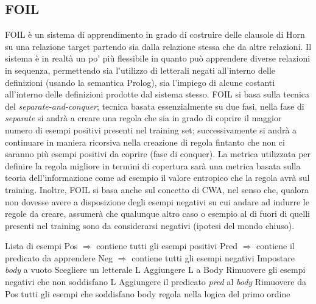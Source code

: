 \subsection{FOIL}
\nocite{Quinlan:1993:FMR:645323.649599}
FOIL è un sistema di apprendimento in grado di costruire delle clausole di Horn su una relazione target partendo sia dalla relazione stessa che da altre relazioni. Il sistema è in realtà un po' più flessibile in quanto può apprendere diverse relazioni in sequenza, permettendo sia l'utilizzo di letterali negati all'interno delle definizioni (usando la semantica Prolog), sia l'impiego di alcune costanti all'interno delle definizioni prodotte dal sistema stesso.
FOIL si basa sulla tecnica del \textit{separate-and-conquer}; tecnica basata essenzialmente su due fasi, nella fase di \textit{separate} si andrà a creare una regola che sia in grado di coprire il maggior numero di esempi positivi presenti nel training set; successivamente si andrà a continuare in maniera ricorsiva nella creazione di regola fintanto che non ci saranno più esempi positivi da coprire (fase di conquer).
La metrica utilizzata per definire la regola migliore in termini di copertura sarà una metrica basata sulla teoria dell'informazione come ad esempio il valore entropico che la regola avrà sul training.
Inoltre, FOIL si basa anche sul concetto di CWA, nel senso che, qualora non dovesse avere a disposizione degli esempi negativi su cui andare ad indurre le regole da creare, assumerà che qualunque altro caso o esempio al di fuori di quelli presenti nel training sono da considerarsi negativi (ipotesi del mondo chiuso).
\begin{algorithm}
	\begin{algorithmic}[1]
	\REQUIRE Lista di esempi
	\STATE Pos $\Rightarrow$ contiene tutti gli esempi positivi
	\STATE Pred $\Rightarrow$ contiene il predicato da apprendere
	\STATE Neg $\Rightarrow$ contiene tutti gli esempi negativi
	\STATE Impostare \textit{body} a vuoto
	\STATE Scegliere un letterale L
	\STATE Aggiungere L a Body
	\STATE Rimuovere gli esempi negativi che non soddisfano L
	\ENDWHILE
	\STATE Aggiungere il predicato \textit{pred} al \textit{body}
	\STATE Rimuovere da Pos tutti gli esempi che soddisfano body
	\ENDWHILE
	\ENDFOR
	\RETURN regola nella logica del primo ordine
	\end{algorithmic}
\end{algorithm}